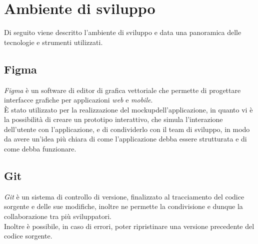 


\section{Ambiente di sviluppo}
\label{sec:ambiente-sviluppo}
Di seguito viene descritto l'ambiente di sviluppo e data una panoramica delle tecnologie e strumenti utilizzati.

\subsection*{Figma}
\label{subsec:figma}

\emph{Figma}\cite{site:figma} è un software di editor di grafica vettoriale che permette di progettare interfacce grafiche per applicazioni \emph{web} e \emph{mobile}.\\
È stato utilizzato per la realizzazione del \gls{mockup}\glsoccur dell'applicazione, in quanto vi è la possibilità di creare un prototipo interattivo, che simula l'interazione dell'utente con l'applicazione, e di condividerlo con il team di sviluppo, in modo da avere un'idea più chiara di come l'applicazione debba essere strutturata e di come debba funzionare.

\subsection*{Git}
\label{subsec:git}

\emph{Git}\cite{site:git} è un sistema di controllo di versione, finalizzato al tracciamento del codice sorgente e delle sue modifiche, inoltre ne permette la condivisione e dunque la collaborazione tra più sviluppatori.\\
Inoltre è possibile, in caso di errori, poter ripristinare una versione precedente del codice sorgente.

